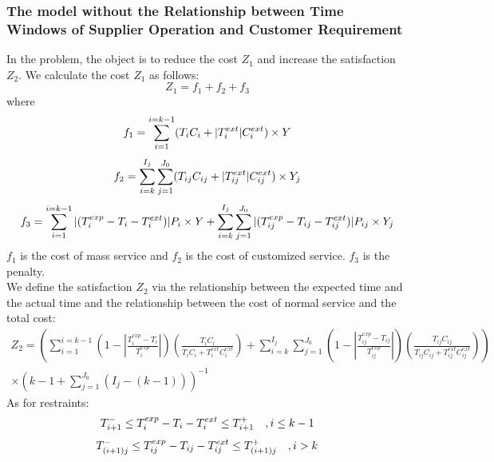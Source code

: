 \documentclass[12pt,a4paper]{article}
\begin{document}
\subsubsection{The model without the Relationship between Time Windows of Supplier Operation and Customer Requirement}
In the problem, the object is to reduce the cost $Z_1$ and increase the satisfaction $Z_2$.
We calculate the cost $Z_1$ as follows:
\begin{equation}
	Z_1=f_1+f_2+f_3
\end{equation}
where
\begin{equation}
	f_1 =\sum_{i=1}^{i=k-1}(T_iC_i+|T_i^{ext}|C_i^{ext})\times Y\\
\end{equation}
\begin{equation}
	f_2 =\sum_{i=k}^{I_j}\sum_{j=1}^{J_0}(T_{ij}C_{ij}+|T_{ij}^{ext}|C_{ij}^{ext})\times Y_j\\
\end{equation}
\begin{equation}
	f_3=\sum_{i=1}^{i=k-1}|(T_i^{exp}-T_i-T_i^{ext})|P_i\times Y+\sum_{i=k}^{I_j}\sum_{j=1}^{J_0}|(T_{ij}^{exp}-T_{ij}-T_{ij}^{ext})|P_{ij}\times Y_j\\
\end{equation}
$f_1$ is the cost of mass service and $f_2$ is the cost of customized service. $f_3$ is the penalty.\\
We define the satisfaction $Z_2$ via the relationship between the expected time and the actual time and the relationship between the cost of normal service and the total cost\cite{Liu}:
\begin{equation}
\begin{split}
	Z_2=(\sum_{i=1}^{i=k-1}(1-|\frac{T_i^{exp}-T_i}{T_i^{exp}}|)(\frac{T_iC_i}{T_iC_i+T_i^{ext}C_i^{ext}})+\sum_{i=k}^{I_j}\sum_{j=1}^{J_0}(1-|\frac{T_{ij}^{exp}-T_{ij}}{T_{ij}^{exp}}|)(\frac{T_{ij}C_{ij}}{T_{ij}C_{ij}+T_{ij}^{ext}C_{ij}^{ext}}))\\
	\times(k-1+\sum_{j=1}^{J_0}(I_j-(k-1)))^{-1}
\end{split}
\end{equation} 
As for restraints:
\begin{equation}
	T_{i+1}^-\leq T_i^{exp}-T_i-T_i^{ext}\leq T_{i+1}^+ \quad ,i\leq k-1\\
\end{equation}
\begin{equation}
	T_{(i+1)j}^-\leq T_{ij}^{exp}-T_{ij}-T_{ij}^{ext}\leq T_{(i+1)j}^+ \quad, i>k\\
\end{equation}
\end{document}
